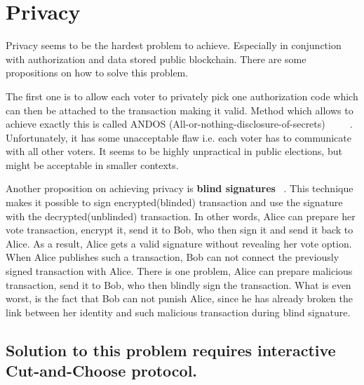 \documentclass[runningheads]{llncs}
\begin{document}
\section{Privacy}
\label{privacy}
Privacy seems to be the hardest problem to achieve. Especially in conjunction with authorization and data stored public blockchain. There are some propositions on how to solve this problem. 

The first one is to allow each voter to privately pick one authorization code which can then be attached to the transaction making it valid. Method which allows to achieve exactly this is called ANDOS (All-or-nothing-disclosure-of-secrets) ~\cite{andos} ~\cite{salomaa1990secret} ~\cite{applied_cryptography}. Unfortunately, it has some unacceptable flaw i.e. each voter has to communicate with all other voters. It seems to be highly unpractical in public elections, but might be acceptable in smaller contexts. 

Another proposition on achieving privacy is \textbf{blind signatures} ~\cite{applied_cryptography}. This technique makes it possible to sign encrypted(blinded) transaction and use the signature with the decrypted(unblinded) transaction. In other words, Alice can prepare her vote transaction, encrypt it, send it to Bob, who then sign it and send it back to Alice. As a result, Alice gets a valid signature without revealing her vote option. When Alice publishes such a transaction, Bob can not connect the previously signed transaction with Alice. 
There is one problem, Alice can prepare malicious transaction, send it to Bob, who then blindly sign the transaction. What is even worst, is the fact that Bob can not punish Alice, since he has already broken the link between her identity and such malicious transaction during blind signature.

\subsection{Solution to this problem requires interactive Cut-and-Choose protocol.}
\label{cut-and-choose}
\end{document}

